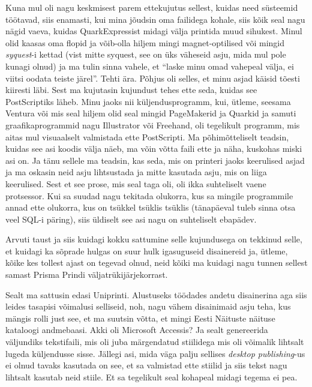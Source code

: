 Kuna mul oli nagu keskmisest parem ettekujutus sellest, kuidas need süsteemid töötavad, siis enamasti,  kui mina jõudsin oma failidega kohale, siis kõik seal nagu nägid vaeva, kuidas QuarkExpressist midagi välja printida muud sihukest. Minul olid kaasas oma flopid ja võib-olla hiljem mingi magnet-optilised või mingid \emph{syquest}-i kettad (vist mitte syquest, see on üks väheseid asju, mida mul pole kunagi olnud) ja ma tulin sinna vahele, et \enquote{laske minu omad vahepeal välja, ei viitsi oodata teiste järel}. Tehti ära. Põhjus oli selles,  et minu asjad käisid tõesti kiiresti läbi. Sest ma kujutasin kujundust tehes ette seda, kuidas see PostScriptiks läheb. Minu jaoks nii küljendusprogramm, kui, ütleme, seesama Ventura või mis seal hiljem olid seal mingid PageMakerid ja Quarkid ja samuti graafikaprogrammid nagu Illustrator või Freehand, oli tegelikult programm, mis aitas mul visuaalselt valmistada ette PostScripti. Ma põhimõtteliselt teadsin, kuidas see asi koodis välja näeb, ma võin võtta faili ette ja näha, kuskohas miski asi on. Ja tänu sellele ma teadsin, kas seda, mis on printeri jaoks keerulised asjad ja ma oskasin neid asju lihtsustada ja mitte kasutada asju, mis on liiga keerulised. Sest et see prose, mis seal taga oli,  oli ikka suhteliselt vaene protsessor. Kui sa suudad nagu tekitada olukorra, kus sa mingile programmile annad ette olukorra, kus on tsükkel tsüklis tsüklis (tänapäeval tuleb sinna otsa veel SQL-i päring), siis üldiselt see asi nagu on suhteliselt ebapädev.  

Arvuti taust ja siis kuidagi kokku sattumine selle kujundusega on tekkinud selle, et kuidagi ka sõprade hulgas on suur hulk igasuguseid disainereid ja, ütleme, kõike kes tollest ajast on tegevad olnud, neid kõiki ma kuidagi nagu tunnen sellest samast Prisma Prindi väljatrükijärjekorrast. 

Sealt ma sattusin edasi Uniprinti. Alustuseks töödades andetu disainerina aga siis leides tasapisi võimalusi selliseid, noh, nagu vähem disainimaid asju teha, kus mängis rolli just see, et ma suutsin võtta, et mingi Eesti Näituste näituse kataloogi andmebaasi. Akki oli Microsoft Accessis? Ja sealt genereerida väljundiks tekstifaili, mis oli juba märgendatud stiilidega mis oli võimalik lihtsalt lugeda  küljendusse sisse. Jällegi asi, mida väga palju sellises \emph{desktop publishing}-us ei olnud tavaks kasutada on  see, et sa  valmistad ette stiilid ja siis tekst nagu lihtsalt kasutab neid stiile. Et sa tegelikult seal kohapeal midagi tegema ei pea.


